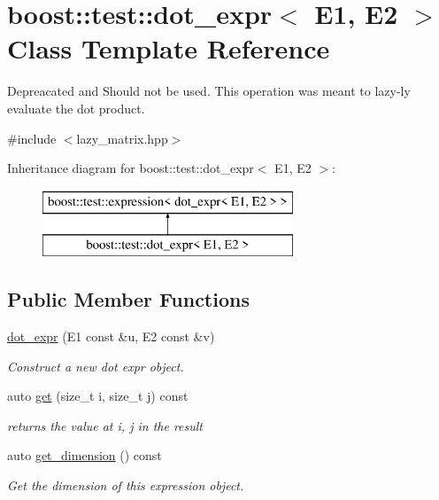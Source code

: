 \hypertarget{classboost_1_1test_1_1dot__expr}{}\section{boost\+::test\+::dot\+\_\+expr$<$ E1, E2 $>$ Class Template Reference}
\label{classboost_1_1test_1_1dot__expr}


Depreacated and Should not be used. This operation was meant to lazy-\/ly evaluate the dot product.  




{\ttfamily \#include $<$lazy\+\_\+matrix.\+hpp$>$}

Inheritance diagram for boost\+::test\+::dot\+\_\+expr$<$ E1, E2 $>$\+:\begin{figure}[H]
\begin{center}
\leavevmode
\includegraphics[height=2.000000cm]{classboost_1_1test_1_1dot__expr}
\end{center}
\end{figure}
\subsection*{Public Member Functions}
\begin{DoxyCompactItemize}
\item 
\mbox{\hyperlink{classboost_1_1test_1_1dot__expr_a7116d6c7f6859d4edcddf9eddf4af6d3}{dot\+\_\+expr}} (E1 const \&u, E2 const \&v)
\begin{DoxyCompactList}\small\item\em Construct a new dot expr object. \end{DoxyCompactList}\item 
auto \mbox{\hyperlink{classboost_1_1test_1_1dot__expr_a9de7f85545afb34236cfc49f02a409ef}{get}} (size\+\_\+t i, size\+\_\+t j) const
\begin{DoxyCompactList}\small\item\em returns the value at i, j in the result \end{DoxyCompactList}\item 
auto \mbox{\hyperlink{classboost_1_1test_1_1dot__expr_aba6c384283170bee5109d9067db15423}{get\+\_\+dimension}} () const
\begin{DoxyCompactList}\small\item\em Get the dimension of this expression object. \end{DoxyCompactList}\end{DoxyCompactItemize}


